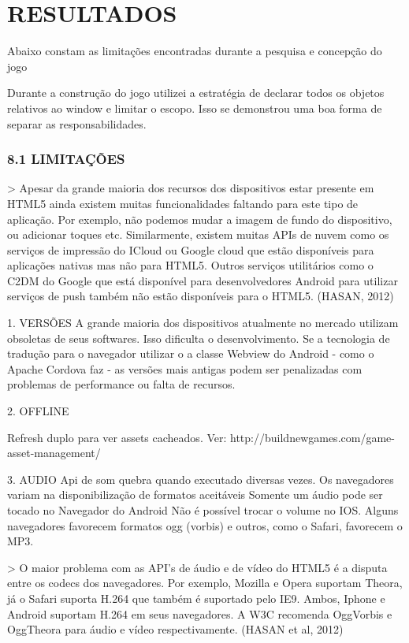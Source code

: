 \documentclass[11pt,a4paper]{article}
\begin{document}
\chapter{RESULTADOS}

Abaixo constam as limitações encontradas durante a pesquisa e concepção do jogo

Durante a construção do jogo utilizei a estratégia de declarar todos
os objetos relativos ao window e limitar o escopo. Isso se demonstrou
uma boa forma de separar as responsabilidades.

\subsection{8.1  LIMITAÇÕES}

> Apesar da grande maioria dos recursos dos dispositivos estar presente
em HTML5 ainda existem muitas funcionalidades faltando para este tipo
de aplicação. Por exemplo, não podemos mudar a imagem de fundo do
dispositivo, ou adicionar toques etc. Similarmente, existem muitas
APIs de nuvem como os serviços de impressão do ICloud ou Google
cloud que estão disponíveis para aplicações nativas mas não para
HTML5. Outros serviços utilitários como o C2DM do Google que está
disponível para desenvolvedores Android para utilizar serviços de push
também não estão disponíveis para o HTML5. (HASAN, 2012)

1.  VERSÕES
A grande maioria dos dispositivos atualmente no mercado utilizam
obsoletas de seus softwares. Isso dificulta o desenvolvimento. Se a
tecnologia de tradução para o navegador utilizar o a classe Webview do
Android - como o Apache Cordova faz - as versões mais antigas podem ser
penalizadas com problemas de performance ou falta de recursos.

2. OFFLINE

Refresh duplo para ver assets cacheados. Ver:
http://buildnewgames.com/game-asset-management/

3. AUDIO
Api de som quebra quando executado diversas vezes.
Os navegadores variam na disponibilização de formatos aceitáveis
Somente um áudio pode ser tocado no Navegador do Android
Não é possível trocar o volume no IOS.
Alguns navegadores favorecem formatos ogg (vorbis) e outros, como o
Safari, favorecem o MP3.

> O maior problema com as API's de áudio e de vídeo do HTML5 é
a disputa entre os codecs dos navegadores. Por exemplo, Mozilla e
Opera suportam Theora, já o Safari suporta H.264 que também é
suportado pelo IE9. Ambos, Iphone e Android suportam H.264 em seus
navegadores. A W3C recomenda OggVorbis e OggTheora para áudio e vídeo
respectivamente. (HASAN et al, 2012)
\end{document}
